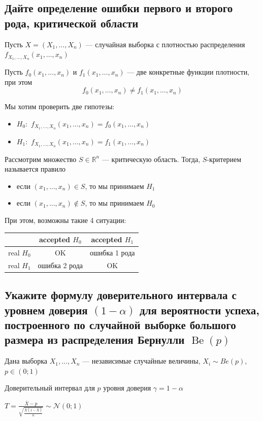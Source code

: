 \documentclass{article}
\begin{document}
\subsection{Дайте определение ошибки первого и второго рода, критической области}
Пусть $X=(X_1,\ldots,X_n)$ — случайная выборка с плотностью распределения $f_{X_1,\ldots,X_n}(x_1,\ldots,x_n)$

Пусть $f_0(x_1,\ldots,x_n)$ и $f_1(x_1,\ldots,x_n)$ — две конкретные функции плотности, при этом $$f_0(x_1,\ldots,x_n)\ne f_1(x_1,\ldots,x_n)$$

Мы хотим проверить две гипотезы:
\begin{itemize}
    \item $H_0:$ $f_{X_1,\ldots,X_n}(x_1,\ldots,x_n)=f_0(x_1,\ldots,x_n)$
    \item $H_1:$ $f_{X_1,\ldots,X_n}(x_1,\ldots,x_n)=f_1(x_1,\ldots,x_n)$
\end{itemize}
Рассмотрим множество $S\in\mathbb{R}^n$ — критическую область. Тогда, $S$-критерием называется правило
\begin{itemize}
    \item если $(x_1,\ldots,x_n)\in S$, то мы принимаем $H_1$
    \item если $(x_1,\ldots,x_n)\not\in S$, то мы принимаем $H_0$
\end{itemize}

При этом, возможны такие 4 ситуации:
\begin{center}
    \begin{tabular}{c|c|c}
        &accepted $H_0$&accepted $H_1$\\
        \hline
        real $H_0$&OK&ошибка 1 рода\\
        \hline
        real $H_1$&ошибка 2 рода&OK
    \end{tabular}
\end{center}

\subsection{Укажите формулу доверительного интервала с уровнем доверия $(1-\alpha)$ для вероятности успеха, построенного по случайной выборке большого размера из распределения Бернулли $\operatorname{Be}(p)$}
Дана выборка $X_1,\ldots,X_n$ — независимые случайные величины, $X_i\sim Be(p)$, $p\in(0;1)$

Доверительный интервал для $p$ уровня доверия $\gamma=1-\alpha$

$T=\displaystyle\frac{\overline{X}-p}{\sqrt{\frac{\overline{X}(1-\overline{X})}{n}}}\sim \mathcal{N}(0;1)$
\end{document}
